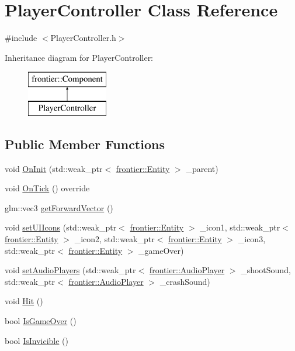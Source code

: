 \hypertarget{class_player_controller}{}\section{Player\+Controller Class Reference}
\label{class_player_controller}


{\ttfamily \#include $<$Player\+Controller.\+h$>$}

Inheritance diagram for Player\+Controller\+:\begin{figure}[H]
\begin{center}
\leavevmode
\includegraphics[height=2.000000cm]{class_player_controller}
\end{center}
\end{figure}
\subsection*{Public Member Functions}
\begin{DoxyCompactItemize}
\item 
void \hyperlink{class_player_controller_a22c60d9e4464ee585f3592593f14bc50}{On\+Init} (std\+::weak\+\_\+ptr$<$ \hyperlink{classfrontier_1_1_entity}{frontier\+::\+Entity} $>$ \+\_\+parent)
\item 
void \hyperlink{class_player_controller_a5641058df338563ff6bb6bce7645ef7b}{On\+Tick} () override
\item 
glm\+::vec3 \hyperlink{class_player_controller_a32543b8dc76ddb473c77afa03760e4d6}{get\+Forward\+Vector} ()
\item 
void \hyperlink{class_player_controller_a6fe2f80c8a3bac13c044e848b12f86ab}{set\+U\+I\+Icons} (std\+::weak\+\_\+ptr$<$ \hyperlink{classfrontier_1_1_entity}{frontier\+::\+Entity} $>$ \+\_\+icon1, std\+::weak\+\_\+ptr$<$ \hyperlink{classfrontier_1_1_entity}{frontier\+::\+Entity} $>$ \+\_\+icon2, std\+::weak\+\_\+ptr$<$ \hyperlink{classfrontier_1_1_entity}{frontier\+::\+Entity} $>$ \+\_\+icon3, std\+::weak\+\_\+ptr$<$ \hyperlink{classfrontier_1_1_entity}{frontier\+::\+Entity} $>$ \+\_\+game\+Over)
\item 
void \hyperlink{class_player_controller_a9bceb77b4a1d71290cc057ab16b64e8b}{set\+Audio\+Players} (std\+::weak\+\_\+ptr$<$ \hyperlink{classfrontier_1_1_audio_player}{frontier\+::\+Audio\+Player} $>$ \+\_\+shoot\+Sound, std\+::weak\+\_\+ptr$<$ \hyperlink{classfrontier_1_1_audio_player}{frontier\+::\+Audio\+Player} $>$ \+\_\+crash\+Sound)
\item 
void \hyperlink{class_player_controller_a7d329fd3ea21feff185a8d700e156a0c}{Hit} ()
\item 
bool \hyperlink{class_player_controller_a420a6722e37b0eb5219d4c2475c47041}{Is\+Game\+Over} ()
\item 
bool \hyperlink{class_player_controller_a8cd8a56ee0332aebb447db6a691aa639}{Is\+Invicible} ()
\end{DoxyCompactItemize}
